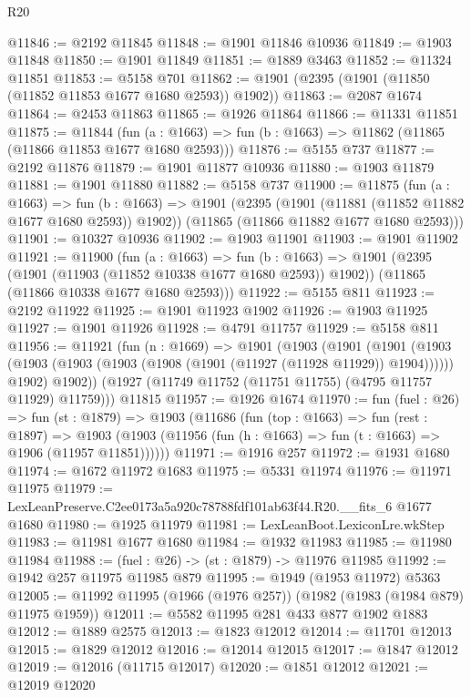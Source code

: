 \begin{lexlean}{R20}
\begin{coremodule}
@11846 := @2192 @11845
@11848 := @1901 @11846 @10936
@11849 := @1903 @11848
@11850 := @1901 @11849
@11851 := @1889 @3463
@11852 := @11324 @11851
@11853 := @5158 @701
@11862 := @1901 (@2395 (@1901 (@11850 (@11852 @11853 @1677 @1680 @2593)) @1902))
@11863 := @2087 @1674
@11864 := @2453 @11863
@11865 := @1926 @11864
@11866 := @11331 @11851
@11875 := @11844
    (fun (a : @1663) => fun (b : @1663) => @11862 (@11865 (@11866 @11853 @1677 @1680 @2593)))
@11876 := @5155 @737
@11877 := @2192 @11876
@11879 := @1901 @11877 @10936
@11880 := @1903 @11879
@11881 := @1901 @11880
@11882 := @5158 @737
@11900 := @11875
    (fun (a : @1663) =>
    fun (b : @1663) =>
    @1901
      (@2395 (@1901 (@11881 (@11852 @11882 @1677 @1680 @2593)) @1902))
      (@11865 (@11866 @11882 @1677 @1680 @2593)))
@11901 := @10327 @10936
@11902 := @1903 @11901
@11903 := @1901 @11902
@11921 := @11900
    (fun (a : @1663) =>
    fun (b : @1663) =>
    @1901
      (@2395 (@1901 (@11903 (@11852 @10338 @1677 @1680 @2593)) @1902))
      (@11865 (@11866 @10338 @1677 @1680 @2593)))
@11922 := @5155 @811
@11923 := @2192 @11922
@11925 := @1901 @11923 @1902
@11926 := @1903 @11925
@11927 := @1901 @11926
@11928 := @4791 @11757
@11929 := @5158 @811
@11956 := @11921
    (fun (n : @1669) =>
    @1901
      (@1903
        (@1901
          (@1901
            (@1903 (@1903 (@1903 (@1903 (@1908 (@1901 (@11927 (@11928 @11929)) @1904))))))
            @1902)
          @1902))
      (@1927 (@11749 @11752 (@11751 @11755) (@4795 @11757 @11929) @11759)))
    @11815
@11957 := @1926 @1674
@11970 := fun (fuel : @26) =>
  fun (st : @1879) =>
  @1903
    (@11686
      (fun (top : @1663) =>
      fun (rest : @1897) =>
      @1903 (@1903 (@11956 (fun (h : @1663) => fun (t : @1663) => @1906 (@11957 @11851))))))
@11971 := @1916 @257
@11972 := @1931 @1680
@11974 := @1672 @11972 @1683
@11975 := @5331 @11974
@11976 := @11971 @11975
@11979 := LexLeanPreserve.C2ee0173a5a920c78788fdf101ab63f44.R20.__fits_6 @1677 @1680
@11980 := @1925 @11979
@11981 := LexLeanBoot.LexiconLre.wkStep
@11983 := @11981 @1677 @1680
@11984 := @1932 @11983
@11985 := @11980 @11984
@11988 := (fuel : @26) -> (st : @1879) -> @11976 @11985
@11992 := @1942 @257 @11975 @11985 @879
@11995 := @1949 (@1953 @11972) @5363
@12005 := @11992 @11995 (@1966 (@1976 @257)) (@1982 (@1983 (@1984 @879) @11975 @1959))
@12011 := @5582 @11995 @281 @433 @877 @1902 @1883
@12012 := @1889 @2575
@12013 := @1823 @12012
@12014 := @11701 @12013
@12015 := @1829 @12012
@12016 := @12014 @12015
@12017 := @1847 @12012
@12019 := @12016 (@11715 @12017)
@12020 := @1851 @12012
@12021 := @12019 @12020

\end{coremodule}
\end{lexlean}
